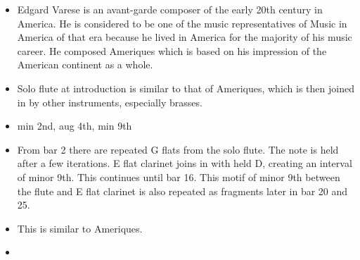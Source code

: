 \documentclass[a4paper,12pt]{article}
\begin{document}
\begin{itemize}
    \item 
Edgard Varese is an avant-garde composer of the early 20th century in America.
He is considered to be one of the music representatives of Music in America of that era because he lived in America for the majority of his music career.
He composed Ameriques which is based on his impression of the American continent as a whole.
    \item 
Solo flute at introduction is similar to that of Ameriques,
which is then joined in by other instruments, especially brasses.
\item
min 2nd, aug 4th, min 9th
\item
From bar 2 there are repeated G flats from the solo flute.
The note is held after a few iterations. 
E flat clarinet joins in with held D, creating an interval of minor 9th.
This continues until bar 16. 
This motif of minor 9th between the flute and E flat clarinet is also repeated as fragments later in bar 20 and 25.
\item
This is similar to Ameriques.
\item
\end{itemize}
\end{document}
